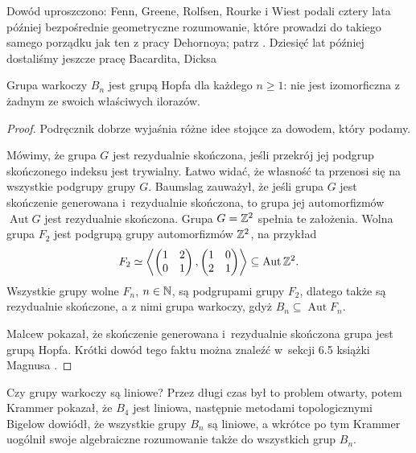 Dowód uproszczono: Fenn, Greene, Rolfsen, Rourke i Wiest podali cztery lata później bezpośrednie geometryczne rozumowanie, które prowadzi do takiego samego porządku jak ten z pracy Dehornoya; patrz \cite{fenn99}.
%
%
%
%
%
Dziesięć lat później dostaliśmy jeszcze pracę Bacardita, Dicksa \cite{bacardit09}
%
%

\begin{proposition}
    Grupa warkoczy $B_n$ jest grupą Hopfa dla każdego $n \ge 1$: nie jest izomorficzna z żadnym ze swoich właściwych ilorazów.
\end{proposition}

\begin{proof}
%
%
    Podręcznik \cite{magnus66} dobrze wyjaśnia różne idee stojące za dowodem, który podamy.

    Mówimy, że grupa $G$ jest rezydualnie skończona, jeśli przekrój jej podgrup skończonego indeksu jest trywialny.
    Łatwo widać, że własność ta przenosi się na wszystkie podgrupy grupy $G$.
    Baumslag zauważył, że jeśli grupa $G$ jest skończenie generowana i~rezydualnie skończona, to grupa jej automorfizmów $\operatorname{Aut} G$ jest rezydualnie skończona.
    Grupa $G = \mathbb Z^2$ spełnia te założenia.
    Wolna grupa $F_2$ jest podgrupą grupy automorfizmów $\mathbb Z^2$, na przykład
    \begin{equation}
        F_2 \simeq \left\langle
        \begin{pmatrix}
            1 & 2 \\
            0 & 1
        \end{pmatrix},
        \begin{pmatrix}
            1 & 0 \\
            2 & 1
        \end{pmatrix}
        \right\rangle \subseteq \operatorname{Aut} \mathbb Z^2.
    \end{equation}
    Wszystkie grupy wolne $F_n$, $n \in \mathbb N$, są podgrupami grupy $F_2$, dlatego także są rezydualnie skończone, a z nimi grupa warkoczy, gdyż $B_n \subseteq \operatorname{Aut} F_n$.

    Malcew pokazał, że skończenie generowana i~rezydualnie skończona grupa jest grupą Hopfa.
    Krótki dowód tego faktu można znaleźć w~sekcji 6.5 książki Magnusa \cite{magnus66}.
\end{proof}

Czy grupy warkoczy są liniowe?
Przez długi czas był to problem otwarty, potem Krammer \cite{krammer00} pokazał, że $B_4$ jest liniowa, następnie metodami topologicznymi Bigelow \cite{bigelow01} dowiódł, że wszystkie grupy $B_n$ są liniowe, a wkrótce po tym Krammer \cite{krammer02} uogólnił swoje algebraiczne rozumowanie także do wszystkich grup $B_n$.
%
%